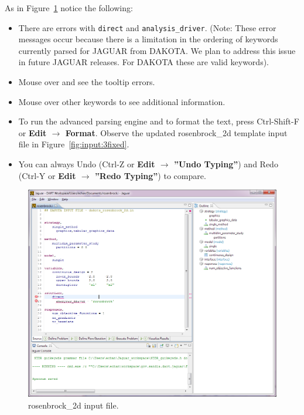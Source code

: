 As in Figure~\ref{fig:input:2rosenbrockfile} notice the following:
\begin{itemize}      
\item There are errors with \texttt{direct} and \texttt{analysis\_driver}. (Note: These error messages occur because there is a limitation in the ordering of keywords currently parsed for JAGUAR from DAKOTA. We plan to address this issue in future JAGUAR releases. For DAKOTA these are valid keywords). 
\item Mouse over and see the tooltip errors.
\item Mouse over other keywords to see additional information.
\item To run the advanced parsing engine and to format the text, press Ctrl-Shift-F or {\bf Edit $\rightarrow$ Format}. Observe the updated rosenbrock\_2d template input file in Figure~\ref{fig:input:3fixed}. 
\item You can always Undo (Ctrl-Z or {\bf Edit $\rightarrow$ ''Undo Typing''}) and Redo (Ctrl-Y or {\bf Edit $\rightarrow$ ''Redo Typing''}) to compare.
\end{itemize}
\begin{figure}[htbp]
  \centering
  \includegraphics[scale=0.6]{images/2rosenbrockfile}
  \caption{rosenbrock\_2d input file.}
  \label{fig:input:2rosenbrockfile}
\end{figure}

